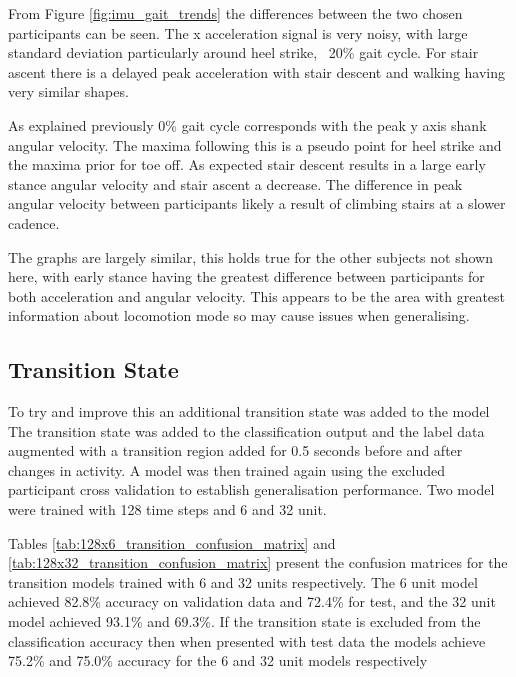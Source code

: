 \documentclass[sensors,article,submit,moreauthors,pdftex]{Definitions/mdpi}
\begin{document}
From Figure \ref{fig:imu_gait_trends} the differences between the two chosen participants can be seen. The x acceleration signal is very noisy, with large standard deviation particularly around heel strike, ~20\% gait cycle. For stair ascent there is a delayed peak acceleration with stair descent and walking having very similar shapes.

As explained previously 0\% gait cycle corresponds with the peak y axis shank angular velocity. The maxima following this is a pseudo point for heel strike and the maxima prior for toe off. As expected stair descent results in a large early stance angular velocity and stair ascent a decrease. The difference in peak angular velocity between participants likely a result of climbing stairs at a slower cadence.

The graphs are largely similar, this holds true for the other subjects not shown here, with early stance having the greatest difference between participants for both acceleration and angular velocity. This appears to be the area with greatest information about locomotion mode so may cause issues when generalising.


\subsection{Transition State}
To try and improve this an additional transition state was added to the model
The transition state was added to the classification output and the label data augmented with a transition region added for 0.5 seconds before and after changes in activity. A model was then trained again using the excluded participant cross validation to establish generalisation performance. Two model were trained with 128 time steps and 6 and 32 unit.

Tables \ref{tab:128x6_transition_confusion_matrix} and \ref{tab:128x32_transition_confusion_matrix} present the confusion matrices for the transition models trained with 6 and 32 units respectively. The 6 unit model achieved 82.8\% accuracy on validation data and 72.4\% for test, and the 32 unit model achieved 93.1\% and 69.3\%. If the transition state is excluded from the classification accuracy then when presented with test data the models achieve 75.2\% and 75.0\% accuracy for the 6 and 32 unit models respectively
\end{document}
